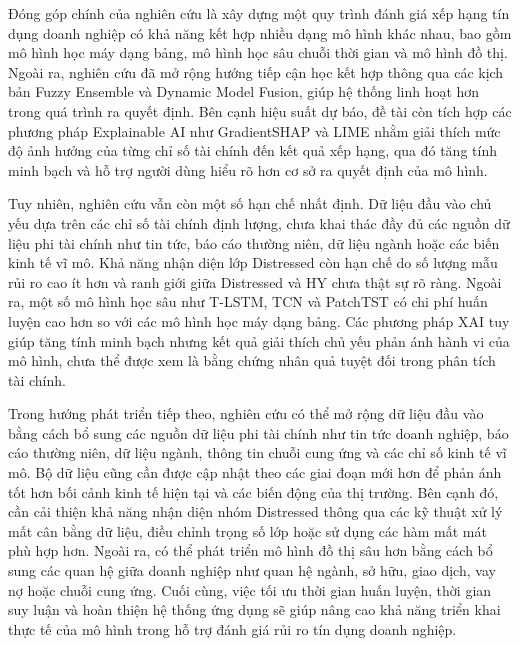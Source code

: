 \documentclass[10pt,twoside]{article}
\begin{document}
Đóng góp chính của nghiên cứu là xây dựng một quy trình đánh giá xếp hạng tín dụng doanh nghiệp có khả năng kết hợp nhiều dạng mô hình khác nhau, bao gồm mô hình học máy dạng bảng, mô hình học sâu chuỗi thời gian và mô hình đồ thị. Ngoài ra, nghiên cứu đã mở rộng hướng tiếp cận học kết hợp thông qua các kịch bản Fuzzy Ensemble và Dynamic Model Fusion, giúp hệ thống linh hoạt hơn trong quá trình ra quyết định. Bên cạnh hiệu suất dự báo, đề tài còn tích hợp các phương pháp Explainable AI như GradientSHAP và LIME nhằm giải thích mức độ ảnh hưởng của từng chỉ số tài chính đến kết quả xếp hạng, qua đó tăng tính minh bạch và hỗ trợ người dùng hiểu rõ hơn cơ sở ra quyết định của mô hình.

Tuy nhiên, nghiên cứu vẫn còn một số hạn chế nhất định. Dữ liệu đầu vào chủ yếu dựa trên các chỉ số tài chính định lượng, chưa khai thác đầy đủ các nguồn dữ liệu phi tài chính như tin tức, báo cáo thường niên, dữ liệu ngành hoặc các biến kinh tế vĩ mô. Khả năng nhận diện lớp Distressed còn hạn chế do số lượng mẫu rủi ro cao ít hơn và ranh giới giữa Distressed và HY chưa thật sự rõ ràng. Ngoài ra, một số mô hình học sâu như T-LSTM, TCN và PatchTST có chi phí huấn luyện cao hơn so với các mô hình học máy dạng bảng. Các phương pháp XAI tuy giúp tăng tính minh bạch nhưng kết quả giải thích chủ yếu phản ánh hành vi của mô hình, chưa thể được xem là bằng chứng nhân quả tuyệt đối trong phân tích tài chính.

Trong hướng phát triển tiếp theo, nghiên cứu có thể mở rộng dữ liệu đầu vào bằng cách bổ sung các nguồn dữ liệu phi tài chính như tin tức doanh nghiệp, báo cáo thường niên, dữ liệu ngành, thông tin chuỗi cung ứng và các chỉ số kinh tế vĩ mô. Bộ dữ liệu cũng cần được cập nhật theo các giai đoạn mới hơn để phản ánh tốt hơn bối cảnh kinh tế hiện tại và các biến động của thị trường. Bên cạnh đó, cần cải thiện khả năng nhận diện nhóm Distressed thông qua các kỹ thuật xử lý mất cân bằng dữ liệu, điều chỉnh trọng số lớp hoặc sử dụng các hàm mất mát phù hợp hơn. Ngoài ra, có thể phát triển mô hình đồ thị sâu hơn bằng cách bổ sung các quan hệ giữa doanh nghiệp như quan hệ ngành, sở hữu, giao dịch, vay nợ hoặc chuỗi cung ứng. Cuối cùng, việc tối ưu thời gian huấn luyện, thời gian suy luận và hoàn thiện hệ thống ứng dụng sẽ giúp nâng cao khả năng triển khai thực tế của mô hình trong hỗ trợ đánh giá rủi ro tín dụng doanh nghiệp.



\end{document}
